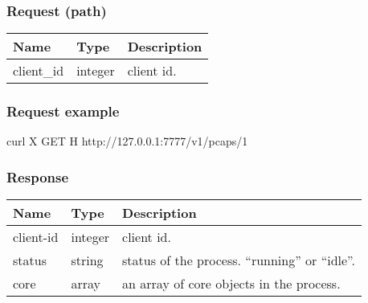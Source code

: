 \documentclass[a4paper,11pt,openany,oneside,english]{sphinxmanual}
\begin{document}
\subsubsection{Request (path)}
\label{\detokenize{api_ref/spp_pcap:request-path}}

\begin{savenotes}\sphinxattablestart
\centering
{}
\sphinxthecaptionisattop
{}\label{\detokenize{api_ref/spp_pcap:id9}}\label{\detokenize{api_ref/spp_pcap:table-spp-ctl-pcap-get}}
\sphinxaftertopcaption
\begin{tabulary}{\linewidth}[t]{|T|T|T|}
\hline
\sphinxstyletheadfamily 
Name
&\sphinxstyletheadfamily 
Type
&\sphinxstyletheadfamily 
Description
\\
\hline
client\_id
&
integer
&
client id.
\\
\hline
\end{tabulary}
\par
\sphinxattableend\end{savenotes}


\subsubsection{Request example}
\label{\detokenize{api_ref/spp_pcap:request-example}}
\begin{sphinxVerbatim}[commandchars=\\\{\},formatcom=\footnotesize]
 curl \PYGZhy{}X GET \PYGZhy{}H  
  http://127.0.0.1:7777/v1/pcaps/1
\end{sphinxVerbatim}


\subsubsection{Response}
\label{\detokenize{api_ref/spp_pcap:response}}

\begin{savenotes}\sphinxattablestart
\centering
{}
\sphinxthecaptionisattop
{}\label{\detokenize{api_ref/spp_pcap:id10}}\label{\detokenize{api_ref/spp_pcap:table-spp-ctl-spp-pcap-res}}
\sphinxaftertopcaption
\begin{tabulary}{\linewidth}[t]{|T|T|T|}
\hline
\sphinxstyletheadfamily 
Name
&\sphinxstyletheadfamily 
Type
&\sphinxstyletheadfamily 
Description
\\
\hline
client-id
&
integer
&
client id.
\\
\hline
status
&
string
&
status of the process. “running” or “idle”.
\\
\hline
core
&
array
&
an array of core objects in the process.
\\
\hline
\end{tabulary}
\par
\sphinxattableend\end{savenotes}
\end{document}
